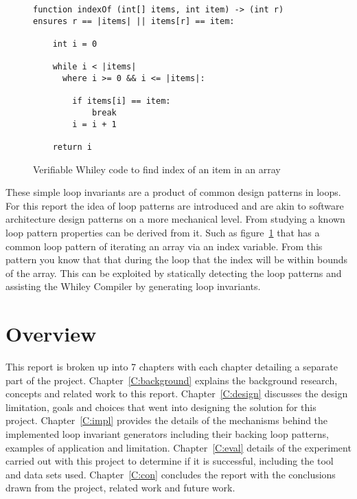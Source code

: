 \begin{figure}[ht]
\begin{lstlisting}
function indexOf (int[] items, int item) -> (int r)
ensures r == |items| || items[r] == item:

    int i = 0

    while i < |items|
      where i >= 0 && i <= |items|:

        if items[i] == item:
            break
        i = i + 1

    return i
\end{lstlisting}
\caption{Verifiable Whiley code to find index of an item in an array}
\label{lst:whiley-ex-1}
\end{figure}

These simple loop invariants are a product of common design patterns in loops.
For this report the idea of loop patterns are introduced and are akin to
software architecture design patterns on a more mechanical level.
From studying a known loop pattern properties can be derived from it.
Such as figure~\ref{lst:whiley-ex-1} that has a common loop pattern of
iterating an array via an index variable.
From this pattern you know that that during the loop that the index will be
within bounds of the array.
This can be exploited by statically detecting the loop patterns and assisting
the Whiley Compiler by generating loop invariants.

\section{Overview}

This report is broken up into 7 chapters with each chapter detailing a separate part of the project.
Chapter~\ref{C:background} explains the background research, concepts and related work to this report.
Chapter~\ref{C:design} discusses the design limitation, goals and choices that went into designing the
solution for this project.
Chapter~\ref{C:impl} provides the details of the mechanisms behind the implemented 
loop invariant generators including their backing loop patterns, examples of application and limitation.
Chapter~\ref{C:eval} details of the experiment carried out with this project to determine if it is
successful, including the tool and data sets used.
Chapter~\ref{C:con} concludes the report with the conclusions drawn from the project,
related work and future work.  